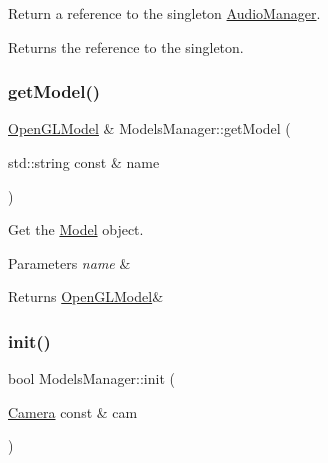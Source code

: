 Return a reference to the singleton \hyperlink{class_audio_manager}{Audio\+Manager}. 

\begin{DoxyReturn}{Returns}
the reference to the singleton. 
\end{DoxyReturn}
\mbox{\label{class_models_manager_ab6b2cbeed2e20b4a6af747b782c3d04b}} 
\subsubsection{\texorpdfstring{get\+Model()}{getModel()}}
{\footnotesize\ttfamily \hyperlink{class_open_g_l_model}{Open\+G\+L\+Model} \& Models\+Manager\+::get\+Model (\begin{DoxyParamCaption}\item[{std\+::string const \&}]{name }\end{DoxyParamCaption})\hspace{0.3cm}{\ttfamily [static]}}



Get the \hyperlink{class_model}{Model} object. 


\begin{DoxyParams}{Parameters}
{\em name} & \\
\hline
\end{DoxyParams}
\begin{DoxyReturn}{Returns}
\hyperlink{class_open_g_l_model}{Open\+G\+L\+Model}\& 
\end{DoxyReturn}
\mbox{\label{class_models_manager_a0802e2a4579035e27f7b273b67e5df71}} 
\subsubsection{\texorpdfstring{init()}{init()}}
{\footnotesize\ttfamily bool Models\+Manager\+::init (\begin{DoxyParamCaption}\item[{\hyperlink{class_camera}{Camera} const \&}]{cam }\end{DoxyParamCaption})\hspace{0.3cm}{\ttfamily [static]}}



